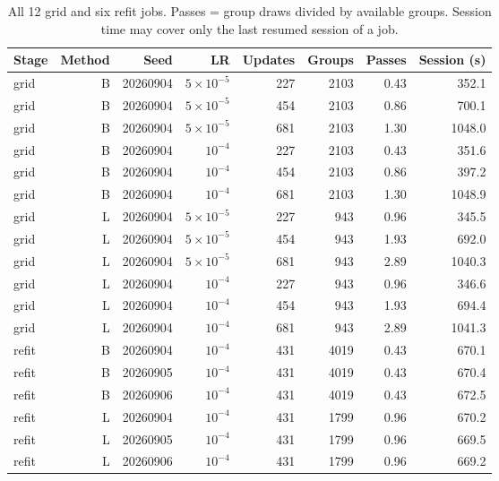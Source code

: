 \begin{table}[htbp]\centering\small
\caption{All 12 grid and six refit jobs. Passes = group draws divided by available groups. Session time may cover only the last resumed session of a job.}\label{tab:trainingcost}
\begin{tabular}{lrrrrrrr}\toprule
Stage & Method & Seed & LR & Updates & Groups & Passes & Session (s)\\\midrule
grid & B & 20260904 & $5\times10^{-5}$ & 227 & 2103 & 0.43 & 352.1\\
grid & B & 20260904 & $5\times10^{-5}$ & 454 & 2103 & 0.86 & 700.1\\
grid & B & 20260904 & $5\times10^{-5}$ & 681 & 2103 & 1.30 & 1048.0\\
grid & B & 20260904 & $10^{-4}$ & 227 & 2103 & 0.43 & 351.6\\
grid & B & 20260904 & $10^{-4}$ & 454 & 2103 & 0.86 & 397.2\\
grid & B & 20260904 & $10^{-4}$ & 681 & 2103 & 1.30 & 1048.9\\
grid & L & 20260904 & $5\times10^{-5}$ & 227 & 943 & 0.96 & 345.5\\
grid & L & 20260904 & $5\times10^{-5}$ & 454 & 943 & 1.93 & 692.0\\
grid & L & 20260904 & $5\times10^{-5}$ & 681 & 943 & 2.89 & 1040.3\\
grid & L & 20260904 & $10^{-4}$ & 227 & 943 & 0.96 & 346.6\\
grid & L & 20260904 & $10^{-4}$ & 454 & 943 & 1.93 & 694.4\\
grid & L & 20260904 & $10^{-4}$ & 681 & 943 & 2.89 & 1041.3\\
refit & B & 20260904 & $10^{-4}$ & 431 & 4019 & 0.43 & 670.1\\
refit & B & 20260905 & $10^{-4}$ & 431 & 4019 & 0.43 & 670.4\\
refit & B & 20260906 & $10^{-4}$ & 431 & 4019 & 0.43 & 672.5\\
refit & L & 20260904 & $10^{-4}$ & 431 & 1799 & 0.96 & 670.2\\
refit & L & 20260905 & $10^{-4}$ & 431 & 1799 & 0.96 & 669.5\\
refit & L & 20260906 & $10^{-4}$ & 431 & 1799 & 0.96 & 669.2\\
\bottomrule\end{tabular}\end{table}

